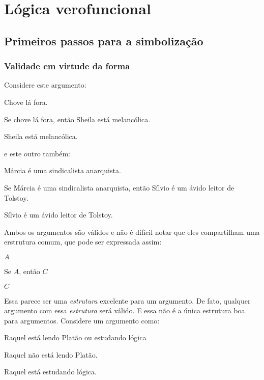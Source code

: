\normalsize
\part{Lógica verofuncional}
\label{ch.TFL}

\chapter{Primeiros passos para a simbolização}

\section{Validade em  virtude da forma}\label{s:ValidityInVirtueOfForm}
Considere este argumento:
	\begin{earg}
		\item[] Chove lá fora.
		\item[] Se chove lá fora, então Sheila está melancólica.
		\item[\therefore] Sheila está melancólica.
	\end{earg}
e este outro também:
	\begin{earg}
		\item[] Márcia é uma sindicalista anarquista.
		\item[] Se Márcia é uma sindicalista anarquista, então Sílvio é um ávido leitor de Tolstoy.
		\item[\therefore] Sílvio é um ávido leitor de Tolstoy.
	\end{earg}
Ambos os argumentos são válidos e não é difícil notar que eles compartilham uma erstrutura comum, que pode ser expressada assim:
	\begin{earg}
		\item[] $A$
		\item[] Se $A$, então $C$
		\item[\therefore] $C$
	\end{earg}
Essa parece ser uma \emph{estrutura} excelente para um argumento.
De fato, qualquer argumento com essa \emph{estrutura} será válido.
E essa não é a única estrutura boa para argumentos.
Considere um argumento como:
	\begin{earg}
		\item[] Raquel está lendo Platão ou estudando lógica
		\item[] Raquel não está lendo Platão.
		\item[\therefore] Raquel está estudando lógica.
	\end{earg}
